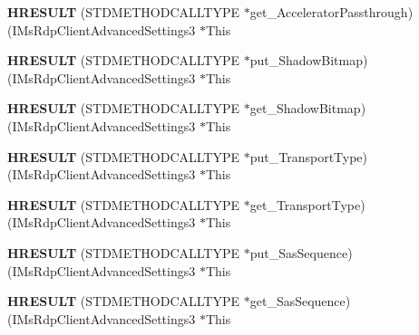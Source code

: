 \begin{DoxyCompactItemize}
{\bfseries H\+R\+E\+S\+U\+LT} (S\+T\+D\+M\+E\+T\+H\+O\+D\+C\+A\+L\+L\+T\+Y\+PE $\ast$get\+\_\+\+Accelerator\+Passthrough)(I\+Ms\+Rdp\+Client\+Advanced\+Settings3 $\ast$This
\item 
\mbox{\label{struct_i_ms_rdp_client_advanced_settings3_vtbl_a0e6370ff28ac31ec12f7a1540c225d7c}} 
{\bfseries H\+R\+E\+S\+U\+LT} (S\+T\+D\+M\+E\+T\+H\+O\+D\+C\+A\+L\+L\+T\+Y\+PE $\ast$put\+\_\+\+Shadow\+Bitmap)(I\+Ms\+Rdp\+Client\+Advanced\+Settings3 $\ast$This
\item 
\mbox{\label{struct_i_ms_rdp_client_advanced_settings3_vtbl_ade706ea71fd337c188f1cd7e1e47e8fd}} 
{\bfseries H\+R\+E\+S\+U\+LT} (S\+T\+D\+M\+E\+T\+H\+O\+D\+C\+A\+L\+L\+T\+Y\+PE $\ast$get\+\_\+\+Shadow\+Bitmap)(I\+Ms\+Rdp\+Client\+Advanced\+Settings3 $\ast$This
\item 
\mbox{\label{struct_i_ms_rdp_client_advanced_settings3_vtbl_a59d54cd59bb2ed6347269f2d8504ef55}} 
{\bfseries H\+R\+E\+S\+U\+LT} (S\+T\+D\+M\+E\+T\+H\+O\+D\+C\+A\+L\+L\+T\+Y\+PE $\ast$put\+\_\+\+Transport\+Type)(I\+Ms\+Rdp\+Client\+Advanced\+Settings3 $\ast$This
\item 
\mbox{\label{struct_i_ms_rdp_client_advanced_settings3_vtbl_a98bf659d1d7db34860bbd9df5bc8ccf2}} 
{\bfseries H\+R\+E\+S\+U\+LT} (S\+T\+D\+M\+E\+T\+H\+O\+D\+C\+A\+L\+L\+T\+Y\+PE $\ast$get\+\_\+\+Transport\+Type)(I\+Ms\+Rdp\+Client\+Advanced\+Settings3 $\ast$This
\item 
\mbox{\label{struct_i_ms_rdp_client_advanced_settings3_vtbl_a0514a525ddaee795a6bf5049e18a0baa}} 
{\bfseries H\+R\+E\+S\+U\+LT} (S\+T\+D\+M\+E\+T\+H\+O\+D\+C\+A\+L\+L\+T\+Y\+PE $\ast$put\+\_\+\+Sas\+Sequence)(I\+Ms\+Rdp\+Client\+Advanced\+Settings3 $\ast$This
\item 
\mbox{\label{struct_i_ms_rdp_client_advanced_settings3_vtbl_ac19fda0e818dfc0a7fde51cdd1aaf5d2}} 
{\bfseries H\+R\+E\+S\+U\+LT} (S\+T\+D\+M\+E\+T\+H\+O\+D\+C\+A\+L\+L\+T\+Y\+PE $\ast$get\+\_\+\+Sas\+Sequence)(I\+Ms\+Rdp\+Client\+Advanced\+Settings3 $\ast$This
\item 

\end{DoxyCompactItemize}
